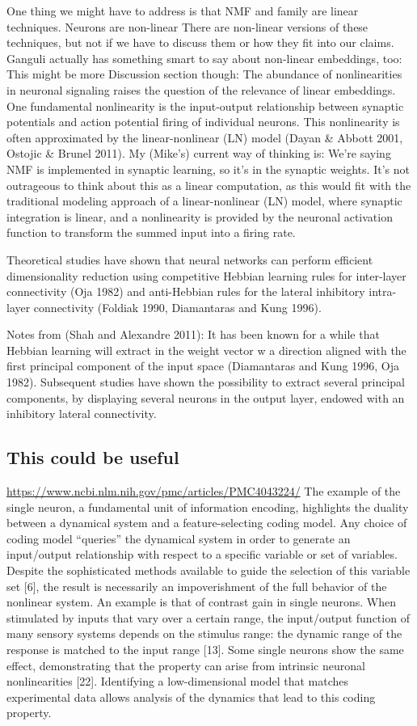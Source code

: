 One thing we might have to address is that NMF and family are linear techniques.
Neurons are non-linear There are non-linear versions of these techniques, but not if we have to 
discuss them or how they fit into our claims.
Ganguli actually has something smart to say about non-linear embeddings, too:
This might be more Discussion section though:
The abundance of nonlinearities in neuronal signaling raises the question of the relevance
of linear embeddings.
One fundamental nonlinearity is the input-output relationship between synaptic potentials and
action potential firing of individual neurons.
This nonlinearity is often approximated by the linear-nonlinear (LN) model
(Dayan \& Abbott 2001, Ostojic \& Brunel 2011).
My (Mike's) current way of thinking is: We're saying NMF is implemented in synaptic learning,
so it's in the synaptic weights. It's not outrageous to think about this as a linear computation,
as this would fit with the traditional modeling approach of a linear-nonlinear (LN) model,
where synaptic integration is linear, and a nonlinearity is provided by the neuronal activation
function to transform the summed input into a firing rate.

Theoretical studies have shown that neural networks can perform efficient dimensionality reduction using competitive Hebbian learning rules for inter-layer connectivity (Oja 1982) and anti-Hebbian rules for the lateral inhibitory intra-layer connectivity (Foldiak 1990, Diamantaras and Kung 1996).

Notes from (Shah and Alexandre 2011): It has been known for a while that Hebbian learning will extract in the weight vector w a direction aligned with the first principal component of the input space (Diamantaras and Kung 1996, Oja 1982). Subsequent studies have shown the possibility to extract several principal components, by displaying several neurons in the output layer, endowed with an inhibitory lateral connectivity.


\subsection{This could be useful}

\url{https://www.ncbi.nlm.nih.gov/pmc/articles/PMC4043224/}
The example of the single neuron, a fundamental unit of information encoding, highlights the duality between a dynamical system and a feature-selecting coding model. Any choice of coding model “queries” the dynamical system in order to generate an input/output relationship with respect to a specific variable or set of variables. Despite the sophisticated methods available to guide the selection of this variable set [6], the result is necessarily an impoverishment of the full behavior of the nonlinear system. An example is that of contrast gain in single neurons. When stimulated by inputs that vary over a certain range, the input/output function of many sensory systems depends on the stimulus range: the dynamic range of the response is matched to the input range [13]. Some single neurons show the same effect, demonstrating that the property can arise from intrinsic neuronal nonlinearities [22]. Identifying a low-dimensional model that matches experimental data allows analysis of the dynamics that lead to this coding property.

